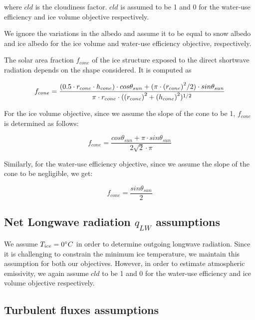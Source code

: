 \documentclass[tc, manuscript]{copernicus}
\begin{document}
where $cld$ is the cloudiness factor. $cld$ is assumed to be 1 and 0 for the water-use efficiency and ice volume
objective respectively.

We ignore the variations in the albedo and assume it to be equal to snow albedo and ice albedo for the  ice
volume and water-use efficiency objective, respectively.

The solar area fraction $f_{cone}$ of the ice structure exposed to the direct shortwave radiation depends on the
shape considered. It is computed as

\begin{equation}
		f_{cone} =\frac{(0.5 \cdot r_{cone} \cdot h_{cone}) \cdot cos \theta_{sun} +(\pi \cdot
			{(r_{cone})}^2/2) \cdot sin \theta_{sun} }{\pi \cdot r_{cone} \cdot ({(r_{cone})}^2+{(h_{cone})}^2)^{1/2}}\\
\end{equation}

For the ice volume objective, since we assume the slope of the cone to be 1, $f_{cone}$ is determined as follows:

\begin{equation}
		f_{cone} =\frac{ cos \theta_{sun} + \pi \cdot sin \theta_{sun} }{2\sqrt{2} \cdot \pi }
\end{equation}

Similarly, for the water-use efficiency objective, since we assume the slope of the cone to be negligible, we get:

\begin{equation}
		f_{cone} =\frac{ sin \theta_{sun} }{2 }
\end{equation}

\subsection{Net Longwave radiation \texorpdfstring{$q_{LW}$}{Lg} assumptions} 

We assume $T_{ice} = 0 ^{\circ} C$ in order to determine outgoing longwave radiation. Since it is challenging to
constrain the minimum ice temperature, we maintain this assumption for both our objectives. However, in order to
estimate atmospheric emissivity, we again assume $cld$ to be 1 and 0 for the water-use efficiency and ice volume
objective respectively.

\subsection{Turbulent fluxes assumptions} \label{sec:Qs}
\end{document}
